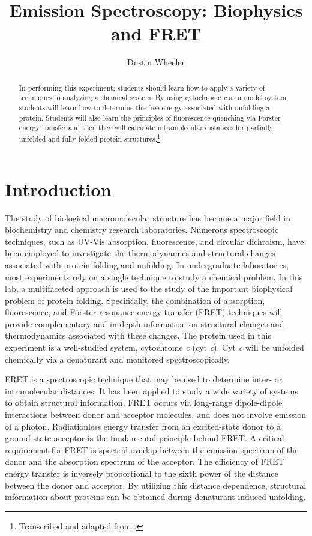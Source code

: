 \documentclass[nobib,nofonts,nols,nohyper]{tufte-handout}
\title{Emission Spectroscopy: Biophysics and FRET}
\author{Dustin Wheeler}
\begin{document}
\maketitle%

\begin{abstract}
\noindent
In performing this experiment, students should learn how to apply a variety of techniques to analyzing a chemical system. By using cytochrome \emph{c} as a model system, students will learn how to determine the free energy associated with unfolding a protein. Students will also learn the principles of fluorescence quenching via Förster energy transfer and then they will calculate intramolecular distances for partially unfolded and fully folded protein structures.\thanks{Transcribed and adapted from \textcite{sanchez08}.}
\end{abstract}

\section{Introduction} %

The study of biological macromolecular structure has become a major field in biochemistry and chemistry research laboratories. 
Numerous spectroscopic techniques, such as UV-Vis absorption, fluorescence, and circular dichroism, have been employed to investigate the thermodynamics and structural changes associated with protein folding and unfolding. 
In undergraduate laboratories, most experiments rely on a single technique to study a chemical problem. 
In this lab, a multifaceted approach is used to the study of the important biophysical problem of protein folding. 
Specifically, the combination of absorption, fluorescence, and Förster resonance energy transfer (FRET) techniques will provide complementary and in-depth information on structural changes and thermodynamics associated with these changes. 
The protein used in this experiment is a well-studied system, cytochrome \emph{c} (cyt \emph{c}). 
Cyt \emph{c} will be unfolded chemically via a denaturant and monitored spectroscopically. 

FRET is a spectroscopic technique that may be used to determine inter- or intramolecular distances. 
It has been applied to study a wide variety of systems to obtain structural information. 
FRET occurs via long-range dipole-dipole interactions between donor and acceptor molecules, and does not involve emission of a photon. 
Radiationless energy transfer from an excited-state donor to a ground-state acceptor is the fundamental principle behind FRET\@. 
A critical requirement for FRET is spectral overlap between the emission spectrum of the donor and the absorption spectrum of the acceptor. 
The efficiency of FRET energy transfer is inversely proportional to the sixth power of the distance between the donor and acceptor. 
By utilizing this distance dependence, structural information about proteins can be obtained during denaturant-induced unfolding. 
\end{document}
